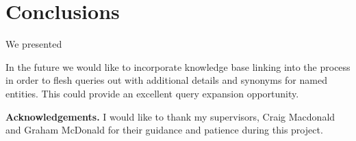 \documentclass{mpaper}
\begin{document}
\section{Conclusions} \label{sec:conclusion}
We presented


In the future we would like to incorporate knowledge base linking into the process in order to flesh queries out with additional details and synonyms for named entities. This could provide an excellent query expansion opportunity.

\vskip8pt \noindent
{\bf Acknowledgements.}
I would like to thank my supervisors, Craig Macdonald and Graham McDonald for their guidance and patience during this project.


\end{document}
